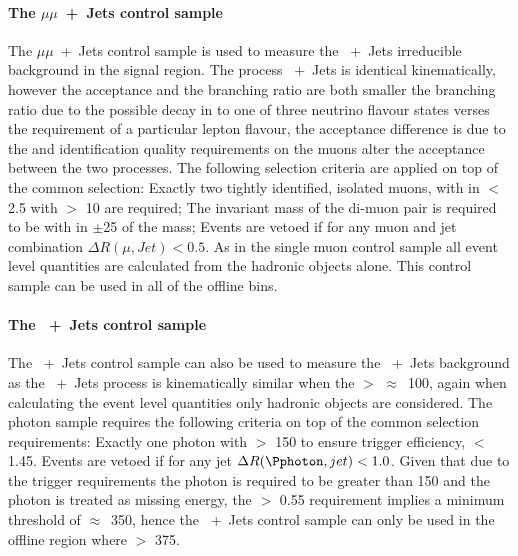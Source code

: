 \paragraph{The $\mu\mu$~+~Jets control sample} %
\label{par:the_mumu_jets_control_sample}
The $\mu\mu$~+~Jets control sample is used to measure the 
\HepProcess{\PZ\to\nu\nu}~+~Jets irreducible background in the signal region. 
The process \HepProcess{\PZ\to\mu\mu}~+~Jets is identical kinematically, 
however the acceptance and the branching ratio are both smaller the branching 
ratio due to the possible decay in to one of three neutrino flavour states 
verses the requirement of a particular lepton flavour, the acceptance 
difference is due to the \PT and identification quality requirements on the 
muons alter the acceptance between the two processes. The following selection 
criteria are applied on top of the common selection: Exactly two tightly 
identified, isolated muons, with in \mETA $<$ 2.5 with \PT $>$ \unit{10}{\GeV} 
are required; The invariant mass of the di-muon pair is required to be with in 
$\pm$\unit{25}{\GeV} of the \PZ mass; Events are vetoed if for any muon and jet 
combination $\Delta R(\mu,Jet) < 0.5$. As in the single muon control sample all 
event level quantities are calculated from the hadronic objects alone. This 
control sample can be used in all of the offline \HT bins.

\paragraph{The \Pphoton~+~Jets control sample} %
\label{par:the_pphoton_jets_control_sample}
The \Pphoton~+~Jets control sample can also be used to measure the 
\HepProcess{\PZ\to\nu\nu}~+~Jets background as the \Pphoton~+~Jets process is 
kinematically similar when the \Pphoton \ET $>$ 
$\approx$~\unit{100}{\GeV}\cite{PAS-SUS-08-002,Bern:2011pa}, again when 
calculating the event level quantities only hadronic objects are considered.
The photon sample requires the following criteria on top of the common 
selection requirements: Exactly one photon with \ET $>$ \unit{150}{\GeV} to 
ensure trigger efficiency, \mETA $<$ 1.45. Events are vetoed if for any jet 
$\Delta R(\Pphoton,jet) < 1.0$. Given that due to the trigger requirements the 
photon \ET is required to be greater than \unit{150}{\GeV} and the photon is 
treated as missing energy, the \alt $>$ 0.55 requirement implies a minimum \HT 
threshold of $\approx$~\unit{350}{\GeV}, hence the \Pphoton~+~Jets control 
sample can only be used in the offline region where \HT $>$ \unit{375}{\GeV}.

